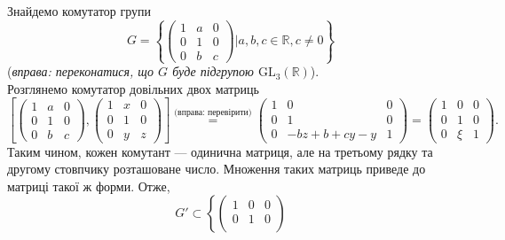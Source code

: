 \documentclass{math_library}
\begin{document}

\iffalse
\begin{example}
Знайдемо комутатор групи 
\[
G = \left\{ \begin{pmatrix}
1 & a & 0 \\
0 & 1 & 0 \\
0 & b & c
\end{pmatrix} \Big| a,b,c \in \mathbb{R}, c \neq 0 \right\}
\] 
(\textit{вправа: переконатися, що $G$ буде підгрупою $\mathrm{GL}_3(\mathbb{R})$}).\\
Розглянемо комутатор довільних двох матриць
\[
\left[ \begin{pmatrix}
1 & a & 0 \\
0 & 1 & 0 \\
0 & b & c
\end{pmatrix},
\begin{pmatrix}
1 & x & 0 \\
0 & 1 & 0 \\
0 & y & z
\end{pmatrix}
\right] \overset{\textit{(вправа: перевірити)}}{=} \begin{pmatrix}
1 & 0 & 0 \\
0 & 1 & 0 \\
0 & -bz+b+cy-y & 1
\end{pmatrix} = \begin{pmatrix}
1 & 0 & 0 \\
0 & 1 & 0 \\
0 & \xi & 1
\end{pmatrix}.
\]
Таким чином, кожен комутант --- одинична матриця, але на третьому рядку та другому стовпчику розташоване число. Множення таких матриць приведе до матриці такої ж форми. Отже, 
\[
G' \subset \left\{ \begin{pmatrix}
1 & 0 & 0 \\
0 & 1 & 0 \\

\end{pmatrix}\]
\end{example}
\end{document}
